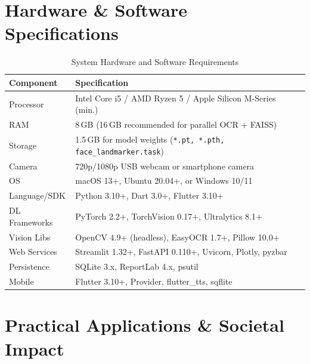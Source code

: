 \documentclass[conference]{IEEEtran}
\begin{document}
\section{Hardware \& Software Specifications}

\begin{table}[htbp]
\caption{System Hardware and Software Requirements}
\label{tab:specs}
\centering
\small
\begin{tabularx}{\columnwidth}{>{\raggedright}p{2.2cm} X}
\toprule
\textbf{Component} & \textbf{Specification} \\
\midrule
Processor       & Intel Core i5 / AMD Ryzen 5 / Apple Silicon M-Series (min.) \\
RAM             & 8\,GB (16\,GB recommended for parallel OCR + FAISS) \\
Storage         & 1.5\,GB for model weights (\texttt{*.pt, *.pth, face\_landmarker.task}) \\
Camera          & 720p/1080p USB webcam or smartphone camera \\
OS              & macOS 13+, Ubuntu 20.04+, or Windows 10/11 \\
Language/SDK    & Python 3.10+, Dart 3.0+, Flutter 3.10+ \\
DL Frameworks   & PyTorch 2.2+, TorchVision 0.17+, Ultralytics 8.1+ \\
Vision Libs     & OpenCV 4.9+ (headless), EasyOCR 1.7+, Pillow 10.0+ \\
Web Services    & Streamlit 1.32+, FastAPI 0.110+, Uvicorn, Plotly, pyzbar \\
Persistence     & SQLite 3.x, ReportLab 4.x, psutil \\
Mobile          & Flutter 3.10+, Provider, flutter\_tts, sqflite \\
\bottomrule
\end{tabularx}
\end{table}

\section{Practical Applications \& Societal Impact}
\end{document}
